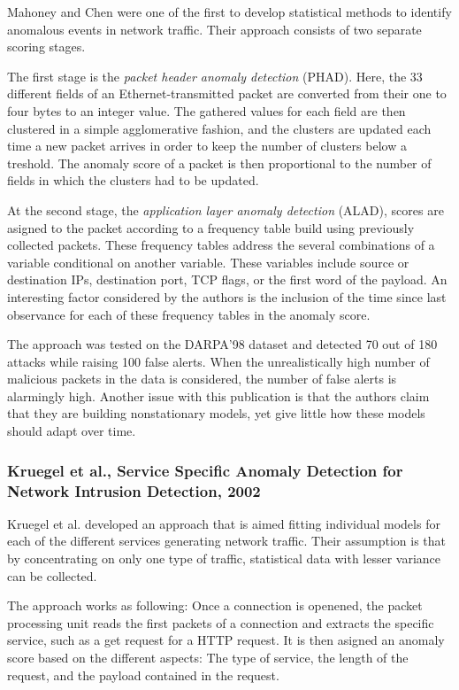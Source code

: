 \documentclass[a4paper,12pt,twoside]{report}
\begin{document}
Mahoney and Chen were one of the first to develop statistical methods to identify anomalous events in network traffic. Their approach consists of two separate scoring stages.

The first stage is the \textit{packet header anomaly detection} (PHAD). Here, the 33 different fields of an Ethernet-transmitted packet are converted from their one to four bytes to an integer value. The gathered values for each field are then clustered in a simple agglomerative fashion, and the clusters are updated each time a new packet arrives in order to keep the number of clusters below a treshold. The anomaly score of a packet is then proportional to the number of fields in which the clusters had to be updated. 

At the second stage, the \textit{application layer anomaly detection} (ALAD), scores are asigned to the packet according to a frequency table build using previously collected packets. These frequency tables address the several combinations of a variable conditional on another variable. These variables include source or destination IPs, destination port, TCP flags, or the first word of the payload. An interesting factor considered by the authors is the inclusion of the time since last observance for each of these frequency tables in the anomaly score.

The approach was tested on the DARPA'98 dataset and detected 70 out of 180 attacks while raising 100 false alerts. When the unrealistically high number of malicious packets in the data is considered, the number of false alerts is alarmingly high. Another issue with this publication is that the authors claim that they are building nonstationary models, yet give little how these models should adapt over time. 

\subsubsection*{Kruegel et al., Service Specific Anomaly Detection for Network Intrusion Detection, 2002 \cite{krugel2002service}}

Kruegel et al. developed an approach that is aimed fitting individual models for each of the different services generating network traffic. Their assumption is that by concentrating on only one type of traffic, statistical data with lesser variance can be collected. 

The approach works as following: Once a connection is openened, the packet processing unit reads the first packets of a connection and extracts the specific service, such as a get request for a HTTP request. It is then asigned an anomaly score based on the different aspects: The type of service, the length of the request, and the payload contained in the request. 
\end{document}
